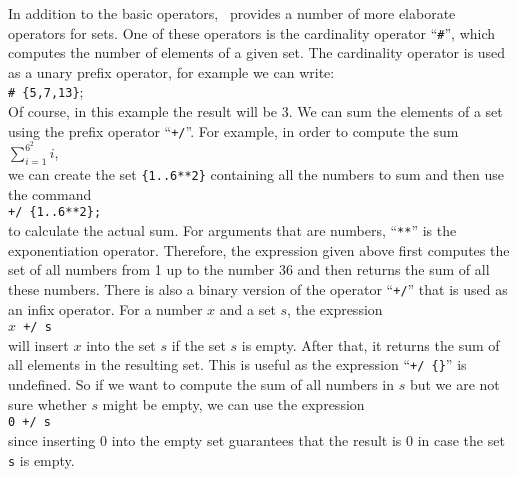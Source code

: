In addition to the basic operators,
\setlx\ provides a number of more elaborate operators for sets.  One of these operators is
the cardinality operator ``\texttt{\#}'', which computes the number of elements of a 
given set.  The cardinality operator is used as a unary prefix operator, for example we can write:
\\[0.2cm]
\hspace*{1.3cm}
\texttt{\# \{5,7,13\}};
\\[0.2cm]
Of course, in this example the result will be $3$.
We can sum the elements of a set using the prefix operator
``\texttt{+/}''.  For example, in order to
compute the sum 
\\[0.2cm]
\hspace*{1.3cm}
$\sum\limits_{i=1}^{6^2} i$,
\\[0.2cm]
we can create the set \texttt{\{1..6**2\}} containing all the numbers
to sum and then use the command
\\[0.2cm]
\hspace*{1.3cm}
\texttt{+/ \{1..6**2\}; }
\\[0.2cm]
to calculate the actual sum.
For arguments that are numbers, ``\texttt{**}'' is the exponentiation operator.
Therefore, the expression given above 
first computes the set of all numbers from 1 up to the number 36 and then returns the sum
of all these numbers.  There is also a binary version of the operator ``\texttt{+/}'' that
is used as an infix operator.  For a number $x$ and a set $s$, the expression
\\[0.2cm]
\hspace*{1.3cm}
\texttt{$x$ +/ s}
\\[0.2cm]
will insert $x$ into the set $s$ if the set $s$ is empty.  After that, it returns the sum of all elements in the
resulting set.  This is useful as the expression ``\texttt{+/ \{\}}'' is undefined.  So
if we want to compute the sum of all numbers in $s$ but we are not sure whether $s$ might
be empty, we can use the expression
\\[0.2cm]
\hspace*{1.3cm}
\texttt{0 +/ s}
\\[0.2cm]
since inserting $0$ into the empty set guarantees that the result is 0 in case  the set
\texttt{s} is empty.

